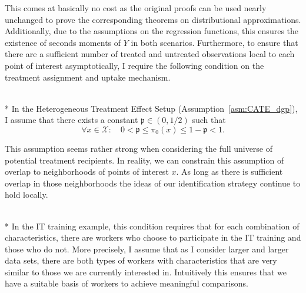 This comes at basically no cost as the original proofs can be used nearly unchanged to prove the corresponding theorems on distributional approximations.
Additionally, due to the assumptions on the regression functions, this ensures the existence of seconds moments of $Y$ in both scenarios.
Furthermore, to ensure that there are a sufficient number of treated and untreated observations local to each point of interest asymptotically, I require the following condition on the treatment assignment and uptake mechanism.
\begin{boxD}
	\begin{asm}\label{asm:treatment_overlap}\mbox{}\\*
		In the Heterogeneous Treatment Effect Setup (Assumption~\ref{asm:CATE_dgp}), I assume that there exists a constant $\mathfrak{p} \in (0, 1/2)$ such that
		\begin{equation}
			\forall x \in \mathcal{X}: \quad 
			0 < \mathfrak{p} \leq \pi_{0}\left(x\right) \leq 1 - \mathfrak{p} < 1.
		\end{equation}
	\end{asm}
\end{boxD}
This assumption seems rather strong when considering the full universe of potential treatment recipients.
In reality, we can constrain this assumption of overlap to neighborhoods of points of interest $x$.
As long as there is sufficient overlap in those neighborhoods the ideas of our identification strategy continue to hold locally.
\begin{boxE}
    \addtocounter{exmp}{-1}
    \begin{exmp}\mbox{}\\*
        In the IT training example, this condition requires that for each combination of characteristics, there are workers who choose to participate in the IT training and those who do not.
        More precisely, I assume that as I consider larger and larger data sets, there are both types of workers with characteristics that are very similar to those we are currently interested in.
        Intuitively this ensures that we have a suitable basis of workers to achieve meaningful comparisons.
    \end{exmp}    
\end{boxE}

